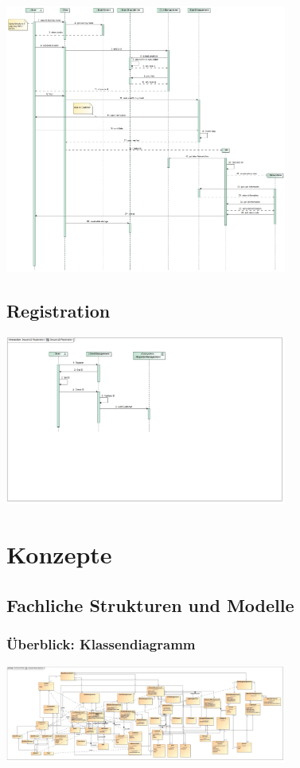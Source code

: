 \documentclass[a4paper]{article}
\begin{document}
\includegraphics[width=350px]{sd-purchase.jpg}

\subsection{Registration}

\includegraphics[width=350px]{sd-registration.jpg}

\section{Konzepte}

\subsection{Fachliche Strukturen und Modelle}

\subsubsection{Überblick: Klassendiagramm}

\includegraphics[width=350px]{analyse-klassendiagramm.jpg}
\end{document}
